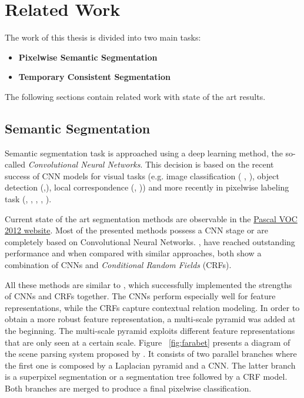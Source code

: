 \chapter[Related Work]{Related Work}
\label{ch:relwork}

The work of this thesis is divided into two main tasks:
\begin{itemize}
 \item \textbf{Pixelwise Semantic Segmentation}
 \item \textbf{Temporary Consistent Segmentation}
\end{itemize}

The following sections contain related work with state of the art results.

\section{Semantic Segmentation}
\label{sec:pixsemseg}
Semantic segmentation task is approached using a deep learning method, the so-called \textit{Convolutional Neural Networks}. This decision is based on the recent success of CNN models for visual tasks (e.g. image classification (\textcite{Krizhevsky_imagenetclassification} \textcite{szegedy2014going}, \textcite{simonyan2014very}), object detection (\textcite{sermanet2013overfeat},\textcite{girshick2014rich}), local correspondence (\textcite{fischer2014descriptor}, \textcite{NIPS2014_5420})) and more recently in pixelwise labeling task (\textcite{farabet2013pami}, \textcite{lin2015efficient}, \textcite{long2014fully}, \textcite{chen14semantic}, \textcite{hariharan2014hypercolumns}). 
 
Current state of the art segmentation methods are observable in the \href{http://host.robots.ox.ac.uk:8080/leaderboard/displaylb.php?challengeid=11&compid=6/}    {Pascal VOC 2012 website}. 
Most of the presented methods possess a CNN stage or are completely based on Convolutional Neural Networks. \textcite{lin2015efficient}, \textcite{chen14semantic} have reached outstanding performance and when compared with similar approaches, both show a combination of CNNs and \textit{Conditional Random Fields} (CRFs). 

All these methods are similar to \textcite{farabet2013pami}, which successfully implemented the strengths of CNNs and CRFs together. The CNNs perform especially well for feature representations, while the CRFs capture contextual relation modeling. In order to obtain a more robust feature representation, a multi-scale pyramid was added at the beginning. The multi-scale pyramid exploits different feature representations that are only seen at a certain scale. Figure ~\ref{fig:farabet} presents a diagram of the scene parsing system proposed by \textcite{farabet2013pami}. It consists of two parallel branches where the first one is composed by a Laplacian pyramid and a CNN. The latter branch is a superpixel segmentation or a segmentation tree followed by a CRF model. Both branches are merged to produce a final pixelwise classification.

